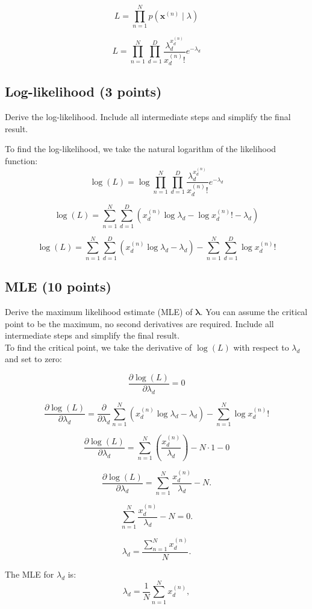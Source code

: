 \documentclass[a4paper,12pt]{article}
\begin{document}
\[
L = \prod_{n=1}^{N} p(\mathbf{x}^{(n)} \mid \lambda)
\]

\[
L = \prod_{n=1}^{N} \prod_{d=1}^{D} \frac{\lambda_d^{x_d^{(n)}}}{x_d^{(n)}!} e^{-\lambda_d}
\]

\subsection{Log-likelihood (3 points)}
Derive the log-likelihood.
Include all intermediate steps and simplify the final result.

To find the log-likelihood, we take the natural logarithm of the likelihood function:
\[
\log(L) = \log \prod_{n=1}^{N} \prod_{d=1}^{D} \frac{\lambda_d^{x_d^{(n)}}}{x_d^{(n)}!} e^{-\lambda_d}
\]

\[
\log(L) = \sum_{n=1}^{N} \sum_{d=1}^{D} \left( x_d^{(n)} \log \lambda_d - \log x_d^{(n)}! - \lambda_d \right)
\]

\[
\log(L) = \sum_{n=1}^{N} \sum_{d=1}^{D} \left( x_d^{(n)} \log \lambda_d - \lambda_d \right) - \sum_{n=1}^{N} \sum_{d=1}^{D} \log x_d^{(n)}!
\]


\subsection{MLE (10 points)}
Derive the maximum likelihood estimate (MLE) of $\mathbf{\lambda}$. You can assume the critical point to be the maximum, no second derivatives are required. Include all intermediate steps and simplify the final result.
\\
To find the critical point, we take the derivative of \(\log(L)\) with respect to \(\lambda_d\) and set to zero:

\[
\frac{\partial \log(L)}{\partial \lambda_d} = 0
\]

\[
\frac{\partial \log(L)}{\partial \lambda_d} = \frac{\partial}{\partial \lambda_d} \sum_{n=1}^{N}  \left( x_d^{(n)} \log \lambda_d - \lambda_d \right) - \sum_{n=1}^{N}  \log x_d^{(n)}!
\]

\[
\frac{\partial \log(L)}{\partial \lambda_d} = \sum_{n=1}^{N}  \left(\frac{ x_d^{(n)}}{ \lambda_d} \right) - N \cdot 1 - 0
\]

\[
\frac{\partial \log(L)}{\partial \lambda_d} = \sum_{n=1}^{N} \frac{x_d^{(n)}}{\lambda_d} - N.
\]

\[
\sum_{n=1}^{N} \frac{x_d^{(n)}}{\lambda_d} - N = 0.
\]

\[
\lambda_d = \frac{\sum_{n=1}^{N} x_d^{(n)}}{N}.
\]

The MLE for \(\lambda_d\) is:
\[
\lambda_d = \frac{1}{N} \sum_{n=1}^{N} x_d^{(n)},
\]
\end{document}
